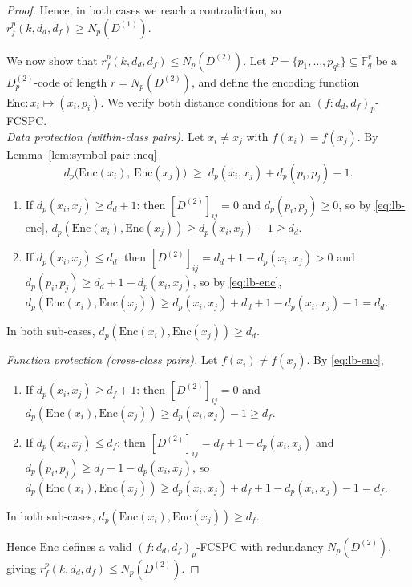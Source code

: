 \documentclass[11pt,draftclsnofoot,journal,onecolumn]{IEEEtran}
\begin{document}
\begin{proof}
        Hence, in both cases we reach a contradiction, so $r_f^p(k,d_d,d_f) \geq N_p(D^{(1)})$.
 
        \noindent
        We now show that $r_f^p(k,d_d,d_f) \leq N_p(D^{(2)})$.
        Let $P = \{p_1, \ldots, p_{q^k}\} \subseteq \mathbb{F}_q^r$ be a $D^{(2)}_p$-code of length $r = N_p(D^{(2)})$, and define the
        encoding function $\mathrm{Enc} : x_i \mapsto (x_i, p_i)$. We verify both distance conditions for an $(f : d_d, d_f)_p$-FCSPC.\\
        \noindent
        \textit{Data protection (within-class pairs).} Let $x_i \neq x_j$ with $f(x_i) = f(x_j)$. By Lemma~\ref{lem:symbol-pair-ineq}
        \begin{equation}
        \label{eq:lb-enc}
        d_p\!\bigl(\mathrm{Enc}(x_i),\,\mathrm{Enc}(x_j)\bigr)
        \;\geq\;
        d_p(x_i,x_j) + d_p(p_i,p_j) - 1.
        \end{equation}
        \begin{enumerate}
         \item If $d_p(x_i, x_j) \geq d_d + 1$: then $[D^{(2)}]_{ij} = 0$
         and $d_p(p_i, p_j) \geq 0$, so by \eqref{eq:lb-enc},
        $d_p(\mathrm{Enc}(x_i), \mathrm{Enc}(x_j)) \geq d_p(x_i,x_j) - 1 \geq d_d$.
 
        \item If $d_p(x_i, x_j) \leq d_d$: then
        $[D^{(2)}]_{ij} = d_d + 1 - d_p(x_i, x_j) > 0$ and
        $d_p(p_i, p_j) \geq d_d + 1 - d_p(x_i, x_j)$, so by \eqref{eq:lb-enc},
        $d_p(\mathrm{Enc}(x_i), \mathrm{Enc}(x_j))
        \geq d_p(x_i, x_j) + d_d + 1 - d_p(x_i, x_j) - 1 = d_d$.
        \end{enumerate}
        In both sub-cases, $d_p(\mathrm{Enc}(x_i), \mathrm{Enc}(x_j)) \geq d_d$.
 
        \noindent
       \textit{Function protection (cross-class pairs).} Let $f(x_i) \neq f(x_j)$. By \eqref{eq:lb-enc},
        \begin{enumerate}
        \item If $d_p(x_i, x_j) \geq d_f + 1$: then $[D^{(2)}]_{ij} = 0$
        and $d_p(\mathrm{Enc}(x_i), \mathrm{Enc}(x_j)) \geq d_p(x_i,x_j) - 1 \geq d_f$.
 
        \item If $d_p(x_i, x_j) \leq d_f$: then $[D^{(2)}]_{ij} = d_f + 1 - d_p(x_i, x_j)$ and $d_p(p_i, p_j) \geq d_f + 1 - d_p(x_i, x_j)$, so $d_p(\mathrm{Enc}(x_i), \mathrm{Enc}(x_j)) \geq d_p(x_i, x_j) + d_f + 1 - d_p(x_i, x_j) - 1 = d_f$.
        \end{enumerate}
        In both sub-cases, $d_p(\mathrm{Enc}(x_i), \mathrm{Enc}(x_j)) \geq d_f$.
 
        Hence $\mathrm{Enc}$ defines a valid $(f : d_d, d_f)_p$-FCSPC with redundancy $N_p(D^{(2)})$, giving $r_f^p(k, d_d, d_f) \leq N_p(D^{(2)})$.
    \end{proof}
    
\end{document}

